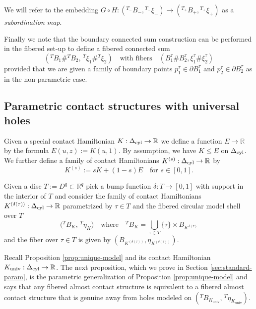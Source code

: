 \documentclass[12pt]{paper}
\theoremstyle{plain}
\theoremstyle{definition}
\newcommand{\p}{\partial}
\newcommand{\R}{{\mathbb{R}}}
\newcommand{\cyl}{{\rm cyl}}
\newcommand{\univ}{\mathrm{univ}}
\numberwithin{figure}{section}
\begin{document}
    We will refer to the embedding $G\circ H:\left({}^{  T_-}   B_-,{}^{T_-}  \xi_-\right)\to   \left({}^{T_+}B_+,{}^{T_+}\xi_+\right)$ as a {\em subordination map}.
    
    Finally we note that the  boundary connected sum construction can be performed in the fibered set-up to define a fibered connected sum 
    $$
    ({}^{T}B_1 \# {}^{T}B_2,\, {}^{T}\xi_1\# {}^{T}\xi_2) \quad\mbox{with fibers}\quad
     (B_1^\tau \# B_2^\tau, \xi_1^{\tau} \# \xi_2^{\tau})
     $$
    provided that we are given a family of boundary points 
    $p_{1}^\tau \in\p B_1^\tau$ and $p_{2}^{\tau} \in \p B_2^\tau$ as in the non-parametric case.
     
  \subsection{Parametric contact structures with universal holes}\label{sec:univ-holes-param}
  Given a special contact Hamiltonian $K:\Delta_\cyl \to\R$ we define a function $E\to\R$ by the formula 
    $E(u, z) := K(u,1)$. By assumption, we have  $K \leq E$ on $\Delta_{\cyl}$.
We further define a family of contact Hamiltonians $K^{(s)}:\Delta_\cyl\to\R$ by
 \begin{equation}\label{e:ParametricHam}
	K^{(s)} :=sK+ (1-s)E \quad\mbox{for $s \in [0,1]$.}
 \end{equation}

   Given a disc $T := D^q \subset \R^q$ pick a bump function $\delta: T \to [0,1]$ with support in the interior of $T$
   and consider the   family of contact Hamiltonians $K^{(\delta(\tau))}: \Delta_{\cyl} \to \R$ parametrized by  $\tau \in T$ 
 and  the fibered circular model shell over $T$
   \begin{equation}\label{e:FiberHamShell}
   	\Big({}^T B_{K},\, {}^T\eta_{K}\Big) \quad\mbox{where}\quad  {}^T B_{K} = \bigcup_{\tau \in T} \{\tau\} \times B_{K^{\delta(\tau)}}
   \end{equation}
 and  the fiber over $\tau \in T$ is given by $(B_{K^{(\delta(\tau))}}, \eta_{K^{(\delta(\tau))}})$.

Recall Proposition \ref{prop:unique-model} and its contact Hamiltonian $K_{\univ}: \Delta_{\cyl} \to \R$.   
The next proposition, which we prove in Section \ref{sec:standard-param},
is the parametric generalization of Proposition \ref{prop:unique-model} and says that any fibered almost contact structure is equivalent to a fibered almost contact structure that is genuine away from holes modeled on $({}^T B_{K_{\univ}},\, {}^T\eta_{K_\univ})$.
\end{document}
